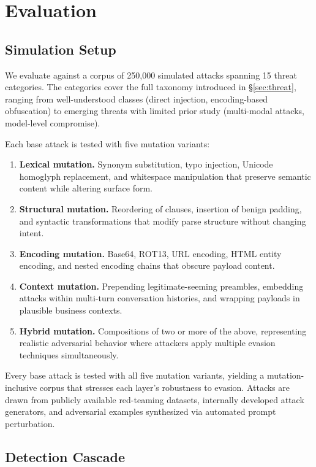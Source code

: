 \section{Evaluation}
\label{sec:evaluation}

\subsection{Simulation Setup}
\label{sec:eval:setup}

We evaluate \sentinel against a corpus of 250,000 simulated attacks spanning 15 threat categories. The categories cover the full taxonomy introduced in \S\ref{sec:threat}, ranging from well-understood classes (direct injection, encoding-based obfuscation) to emerging threats with limited prior study (multi-modal attacks, model-level compromise).

Each base attack is tested with five mutation variants:
\begin{enumerate}[leftmargin=*]
\item \textbf{Lexical mutation.} Synonym substitution, typo injection, Unicode homoglyph replacement, and whitespace manipulation that preserve semantic content while altering surface form.
\item \textbf{Structural mutation.} Reordering of clauses, insertion of benign padding, and syntactic transformations that modify parse structure without changing intent.
\item \textbf{Encoding mutation.} Base64, ROT13, URL encoding, HTML entity encoding, and nested encoding chains that obscure payload content.
\item \textbf{Context mutation.} Prepending legitimate-seeming preambles, embedding attacks within multi-turn conversation histories, and wrapping payloads in plausible business contexts.
\item \textbf{Hybrid mutation.} Compositions of two or more of the above, representing realistic adversarial behavior where attackers apply multiple evasion techniques simultaneously.
\end{enumerate}

Every base attack is tested with all five mutation variants, yielding a mutation-inclusive corpus that stresses each layer's robustness to evasion. Attacks are drawn from publicly available red-teaming datasets, internally developed attack generators, and adversarial examples synthesized via automated prompt perturbation.

\subsection{Detection Cascade}
\label{sec:eval:cascade}

